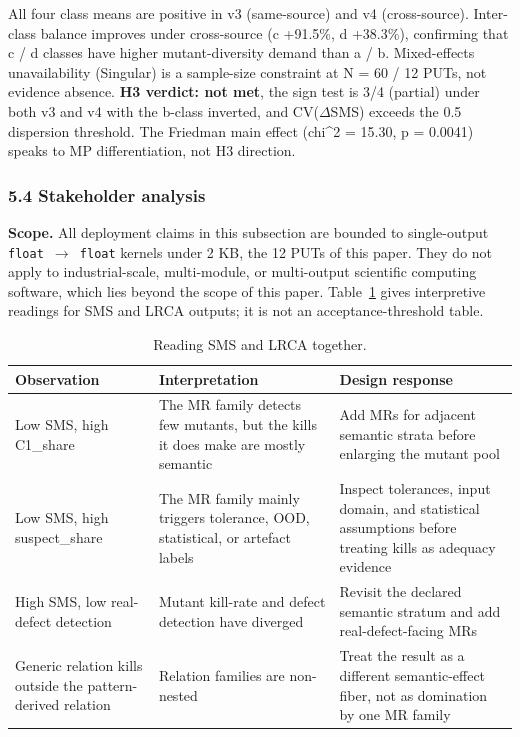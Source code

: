 \documentclass[review,12pt,authoryear]{elsarticle}
\begin{document}
All four class means are positive in v3 (same-source) and v4
(cross-source). Inter-class balance improves under cross-source (c
+91.5\%, d +38.3\%), confirming that c / d classes have higher
mutant-diversity demand than a / b. Mixed-effects unavailability
(Singular) is a sample-size constraint at N = 60 / 12 PUTs, not evidence
absence. \textbf{H3 verdict: not met}, the sign test is 3/4 (partial)
under both v3 and v4 with the b-class inverted, and CV($\Delta$SMS)
exceeds the 0.5 dispersion threshold. The Friedman main effect (chi\^{}2 =
15.30, p = 0.0041) speaks to MP differentiation, not H3 direction.

\subsubsection{5.4 Stakeholder analysis}\label{stakeholder-analysis-single-output-kernels-scope}

\textbf{Scope.} All deployment claims in this subsection are bounded to
single-output \texttt{float\ $\to$\ float} kernels under 2 KB, the 12 PUTs
of this paper. They do not apply to industrial-scale, multi-module, or
multi-output scientific computing software, which lies beyond the scope of this paper.
Table~\ref{tab:sms-lrca-reading} gives interpretive readings for SMS and
LRCA outputs; it is not an acceptance-threshold table.

{\def\LTcaptype{table} %
\begin{longtable}[]{@{}
  >{\raggedright\arraybackslash}p{}
  >{\raggedright\arraybackslash}p{}
  >{\raggedright\arraybackslash}p{}@{}}
\caption{Reading SMS and LRCA together.}\label{tab:sms-lrca-reading}\\
\toprule\noalign{}
Observation & Interpretation & Design response \\
\midrule\noalign{}
\endfirsthead
\endhead
\bottomrule\noalign{}
\endlastfoot
Low SMS, high C1\_share & The MR family detects few mutants, but the
kills it does make are mostly semantic & Add MRs for adjacent semantic
strata before enlarging the mutant pool \\
Low SMS, high suspect\_share & The MR family mainly triggers tolerance,
OOD, statistical, or artefact labels & Inspect tolerances, input domain,
and statistical assumptions before treating kills as adequacy evidence \\
High SMS, low real-defect detection & Mutant kill-rate and defect
detection have diverged & Revisit the declared semantic stratum and add
real-defect-facing MRs \\
Generic relation kills outside the pattern-derived relation & Relation
families are non-nested & Treat the result as a different
semantic-effect fiber, not as domination by one MR family \\
\end{longtable}
}
\end{document}
